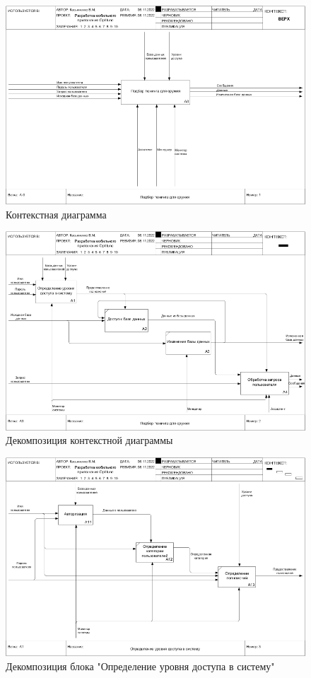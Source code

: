 \documentclass[14pt]{extreport}
\begin{document}
\begin{landscape}
\begin{figure}[H]
\centerline{\includegraphics[width=0.9\linewidth]{01_A-0}}
\caption{Контекстная диаграмма}
\label{fig9}
\end{figure}

\begin{figure}[H]
\centerline{\includegraphics[width=0.9\linewidth]{02_A0}}
\caption{Декомпозиция контекстной диаграммы}
\label{fig10}
\end{figure}

\begin{figure}[H]
\centerline{\includegraphics[width=0.9\linewidth]{03_A1}}
\caption{Декомпозиция блока "Определение уровня доступа в систему"}
\label{fig11}
\end{figure}


\end{landscape}
\end{document}
